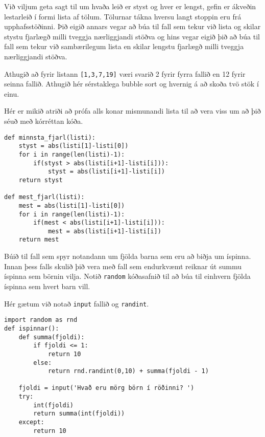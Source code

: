 \begin{exercise}\label{rei2}
Við viljum geta sagt til um hvaða leið er styst og hver er lengst, gefin er ákveðin lestarleið í formi lista af tölum.
Tölurnar tákna hversu langt stoppin eru frá upphafsstöðinni.
Þið eigið annars vegar að búa til fall sem tekur við lista og skilar stystu fjarlægð milli tveggja nærliggjandi stöðva og hins vegar eigið þið að búa til fall sem tekur við sambærilegum lista en skilar lengstu fjarlægð milli tveggja nærliggjandi stöðva.

Athugið að fyrir listann \texttt{[1,3,7,19]} væri svarið 2 fyrir fyrra fallið en 12 fyrir seinna fallið.
Athugið hér sérstaklega bubble sort og hvernig á að skoða tvö stök í einu.
\end{exercise}
\begin{Answer}[ref={rei2}]
Hér er mikið atriði að prófa alls konar mismunandi lista til að vera viss um að þið séuð með kórréttan kóða.
	\begin{lstlisting}
def minnsta_fjarl(listi):
	styst = abs(listi[1]-listi[0])
	for i in range(len(listi)-1):
		if(styst > abs(listi[i+1]-listi[i])):
			styst = abs(listi[i+1]-listi[i])
	return styst

def mest_fjarl(listi):
	mest = abs(listi[1]-listi[0])
	for i in range(len(listi)-1):
		if(mest < abs(listi[i+1]-listi[i])):
			mest = abs(listi[i+1]-listi[i])
	return mest

\end{lstlisting}
\end{Answer}

\begin{exercise}\label{rei3}
Búið til fall sem spyr notandann um fjölda barna sem eru að biðja um íspinna.
Innan þess falls skulið þið vera með fall sem endurkvæmt reiknar út summu íspinna sem börnin vilja.
Notið \texttt{random} kóðasafnið til að búa til einhvern fjölda íspinna sem hvert barn vill.
\end{exercise}
\begin{Answer}[ref={rei3}]
Hér gætum við notað \texttt{input} fallið og \texttt{randint}.
	\begin{lstlisting}
import random as rnd
def ispinnar():
	def summa(fjoldi):
		if fjoldi <= 1:
			return 10
		else:
			return rnd.randint(0,10) + summa(fjoldi - 1)

	fjoldi = input('Hvað eru mörg börn í röðinni? ')
	try:
		int(fjoldi)
		return summa(int(fjoldi))
	except:
		return 10
	\end{lstlisting}
\newpage
\end{Answer}